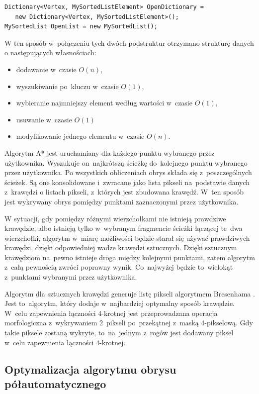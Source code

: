 \documentclass[a4paper,11pt,twoside,openright]{report}
\theoremstyle{definition}
\begin{document}
\begin{verbatim}
Dictionary<Vertex, MySortedListElement> OpenDictionary =
   new Dictionary<Vertex, MySortedListElement>();
MySortedList OpenList = new MySortedList();
\end{verbatim}

W ten sposób w~połączeniu tych dwóch podstruktur otrzymano strukturę danych
o następujących własnościach:
\begin{itemize}[noitemsep]
\item dodawanie w~czasie $O(n)$,
\item wyszukiwanie po~kluczu w~czasie $O(1)$,
\item wybieranie najmniejszy element według wartości w~czasie $O(1)$,
\item usuwanie w~czasie $O(1)$
\item modyfikowanie jednego elementu w~czasie $O(n)$.
\end{itemize}

Algorytm A* jest uruchamiany dla każdego punktu wybranego przez użytkownika.
Wyszukuje on~najkrótszą ścieżkę do~kolejnego punktu wybranego przez użytkownika.
Po wszystkich obliczeniach obrys składa się z~poszczególnych ścieżek. Są one
konsolidowane i~zwracane jako lista pikseli na~podstawie danych z~krawędzi o
listach pikseli, z~których jest zbudowana krawędź. W~ten sposób jest wykrywany
obrys pomiędzy punktami zaznaczonymi przez użytkownika.

W sytuacji, gdy pomiędzy różnymi wierzchołkami nie istnieją prawdziwe krawędzie,
albo istnieją tylko w~wybranym fragmencie ścieżki łączącej te~dwa wierzchołki,
algorytm w~miarę możliwości będzie starał się używać prawdziwych krawędzi, dzięki
odpowiedniej wadze krawędzi sztucznych. Dzięki sztucznym krawędziom na~pewno
istnieje droga między kolejnymi punktami, zatem algorytm z~całą pewnością zwróci
poprawny wynik. Co~najwyżej będzie to~wielokąt z~punktami wybranymi przez użytkownika.

Algorytm dla sztucznych krawędzi generuje listę pikseli algorytmem Bresenhama
\cite{Bresenham}. Jest to~algorytm, który dodaje w~najbardziej optymalny sposób
krawędzie. W~celu zapewnienia łączności 4-krotnej jest przeprowadzana operacja
morfologiczna z~wykrywaniem 2~pikseli po~przekątnej z~maską 4-pikselową. Gdy takie
piksele zostaną wykryte, to~na~jednym z~rogów jest dodawany piksel w~celu
zapewnienia łączności 4-krotnej.

\subsection {Optymalizacja algorytmu obrysu półautomatycznego}
\end{document}
